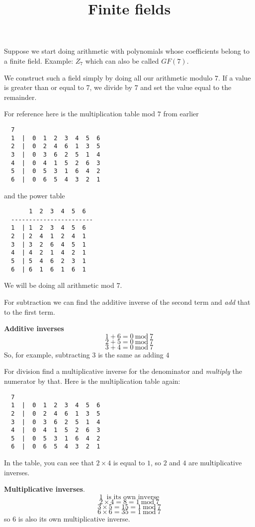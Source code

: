 \documentclass[11pt, oneside]{article}
\title{Finite fields}
\date{}
\begin{document}
\maketitle
\Large

Suppose we start doing arithmetic with polynomials whose coefficients belong to a finite field.  Example:  $Z_7$ which can also be called $GF(7)$.

We construct such a field simply by doing all our arithmetic modulo $7$.  If a value is greater than or equal to 7, we divide by $7$ and set the value equal to the remainder.

For reference here is the multiplication table mod $7$ from earlier

\begin{verbatim}
  7
  1  |  0  1  2  3  4  5  6
  2  |  0  2  4  6  1  3  5
  3  |  0  3  6  2  5  1  4
  4  |  0  4  1  5  2  6  3
  5  |  0  5  3  1  6  4  2
  6  |  0  6  5  4  3  2  1
\end{verbatim}

and the power table

\begin{verbatim}
       1  2  3  4  5  6
  -----------------------
  1  | 1  2  3  4  5  6
  2  | 2  4  1  2  4  1
  3  | 3  2  6  4  5  1
  4  | 4  2  1  4  2  1
  5  | 5  4  6  2  3  1  
  6  | 6  1  6  1  6  1
\end{verbatim}

We will be doing all arithmetic mod $7$.  

For subtraction we can find the additive inverse of the second term and \emph{add} that to the first term.

\textbf{Additive inverses}
\[ 1 + 6 = 0 \  \text{mod} \  7 \]
\[ 2 + 5 = 0 \  \text{mod} \  7 \]
\[ 3 + 4 = 0 \  \text{mod} \  7 \]
So, for example, subtracting $3$ is the same as adding $4$

For division find a multiplicative inverse for the denominator and \emph{multiply} the numerator by that. Here is the multiplication table again:

\begin{verbatim}
  7
  1  |  0  1  2  3  4  5  6
  2  |  0  2  4  6  1  3  5
  3  |  0  3  6  2  5  1  4
  4  |  0  4  1  5  2  6  3
  5  |  0  5  3  1  6  4  2
  6  |  0  6  5  4  3  2  1
\end{verbatim}

In the table, you can see that $2 \times 4$ is equal to $1$, so $2$ and $4$ are multiplicative inverses.

\textbf{Multiplicative inverses}.
\[ 1 \ \text{ is its own inverse} \]
\[ 2 \times 4 = 8  = 1 \  \text{mod} \  7 \]
\[ 3 \times 5 = 15 = 1 \  \text{mod} \  7 \]
\[ 6 \times 6 = 35 = 1 \  \text{mod} \  7 \]
so $6$ is also its own multiplicative inverse.
\end{document}
